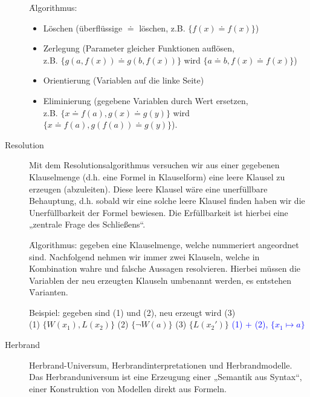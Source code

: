 \begin{description}
            \f{Algorithmus:}
            \begin{itemize}
                \item Löschen (überflüssige $\doteq$ löschen, z.B. $\{ f(x) \doteq f(x) \}$)
                \item Zerlegung (Parameter gleicher Funktionen auflösen, \\
                    z.B. $\{g(a, f(x)) \doteq g(b, f(x))\}$ wird $\{a \doteq b, f(x) \doteq f(x) \}$)
                \item Orientierung (Variablen auf die linke Seite)
                \item Eliminierung (gegebene Variablen durch Wert ersetzen, \\
                    z.B. $\{ x \doteq f(a), g(x) \doteq g(y) \}$ wird $\{ x \doteq f(a), g(f(a)) \doteq g(y)\}$).
            \end{itemize}

        \item[Resolution]
            Mit dem Resolutionsalgorithmus versuchen wir aus einer gegebenen Klauselmenge (d.h. eine Formel in Klauselform) eine leere Klausel zu erzeugen (abzuleiten). Diese leere Klausel wäre eine unerfüllbare Behauptung, d.h. sobald wir eine solche leere Klausel finden haben wir die Unerfüllbarkeit der Formel bewiesen. Die Erfüllbarkeit ist hierbei eine „zentrale Frage des Schließens“.

            \f{Algorithmus:} gegeben eine Klauselmenge, welche nummeriert angeordnet sind.
            Nachfolgend nehmen wir immer zwei Klauseln, welche in Kombination wahre und falsche Aussagen resolvieren. Hierbei müssen die Variablen der neu erzeugten Klauseln umbenannt werden, es entstehen \f{Varianten}.   

            Beispiel: gegeben sind (1) und (2), neu erzeugt wird (3) \\
            (1) $\{ W(x_{1}), L(x_{2}) \}$ \hspace{1cm}
            (2) $\{ \neg W(a)\}$ \hspace{1cm}
            (3) $\{ L(x_{2}')\}$ \textcolor{blue}{(1) + (2), $\{ x_{1} \mapsto a \}$} \\

        \item[Herbrand] Herbrand-Universum, Herbrandinterpretationen und Herbrandmodelle.  \\
            Das Herbranduniversum ist eine Erzeugung einer „Semantik aus Syntax“, einer Konstruktion von Modellen direkt aus Formeln.


\end{description}
